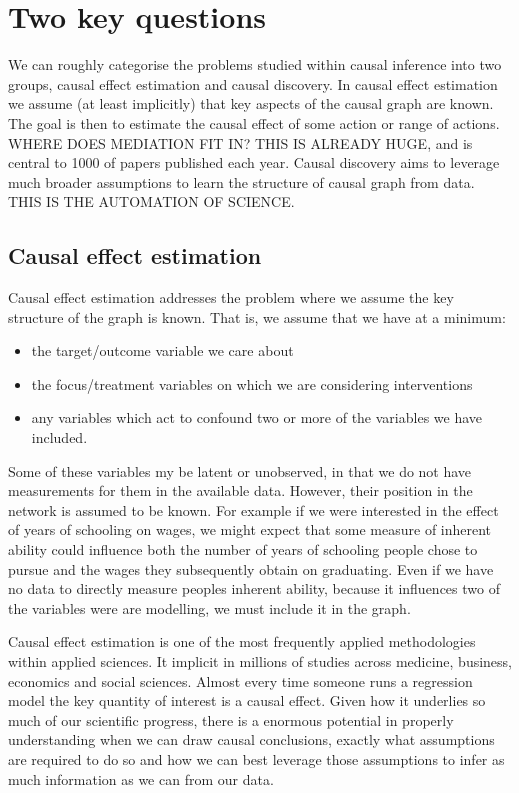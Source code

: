 \documentclass[11pt,a4paper,oneside]{book}
\theoremstyle{plain}
\theoremstyle{definition}
\begin{document}
\chapter{Two key questions}

We can roughly categorise the problems studied within causal inference into two groups, causal effect estimation and causal discovery. In causal effect estimation we assume (at least implicitly) that key aspects of the causal graph are known. The goal is then to estimate the causal effect of some action or range of actions. WHERE DOES MEDIATION FIT IN? THIS IS ALREADY HUGE, and is central to 1000 of papers published each year. Causal discovery aims to leverage much broader assumptions to learn the structure of causal graph from data. THIS IS THE AUTOMATION OF SCIENCE.

 
\section{Causal effect estimation} 

Causal effect estimation addresses the problem where we assume the key structure of the graph is known. That is, we assume that we have at a minimum:

\begin{itemize}
\item the target/outcome variable we care about
\item the focus/treatment variables on which we are considering interventions
\item any variables which act to confound two or more of the variables we have included.
\end{itemize}

Some of these variables my be latent or unobserved, in that we do not have measurements for them in the available data. However, their position in the network is assumed to be known. For example if we were interested in the effect of years of schooling on wages, we might expect that some measure of inherent ability could influence both the number of years of schooling people chose to pursue and the wages they subsequently obtain on graduating. Even if we have no data to directly measure peoples inherent ability, because it influences two of the variables were are modelling, we must include it in the graph.

Causal effect estimation is one of the most frequently applied methodologies within applied sciences. It implicit in millions of studies across medicine, business, economics and social sciences. Almost every time someone runs a regression model the key quantity of interest is a causal effect. Given how it underlies so much of our scientific progress, there is a enormous potential in properly understanding when we can draw causal conclusions, exactly what assumptions are required to do so and how we can best leverage those assumptions to infer as much information as we can from our data. 
\end{document}
